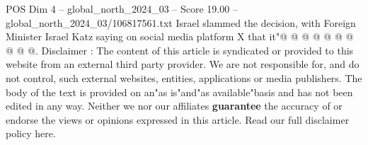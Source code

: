 \begin{textsample}{POS Dim 4 – global\_north\_2024\_03 – Score 19.00 – global\_north\_2024\_03/106817561.txt}
Israel slammed the decision, with Foreign Minister Israel Katz saying on social media platform X that it"@ @ @ @ @ @ @ @ @ @.
Disclaimer : The content of this article is syndicated or provided to this website from an external third party provider.
We are not responsible for, and do not control, such external websites, entities, applications or media publishers.
The body of the text is provided on an"as is"and"as available"basis and has not been edited in any way.
Neither we nor our affiliates \textbf{guarantee} the accuracy of or endorse the views or opinions expressed in this article.
Read our full disclaimer policy here.

\end{textsample}
